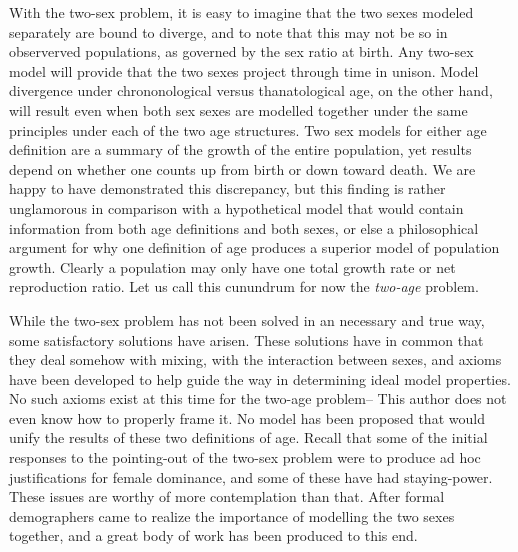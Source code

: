 With the two-sex problem, it is easy to imagine that the two sexes modeled
separately are bound to diverge, and to note that this may not be so in
observerved populations, as governed by the sex ratio at birth. Any two-sex
model will provide that the two sexes project through time in unison. Model
divergence under chrononological versus thanatological age, on the other hand,
will result even when both sex sexes are modelled together under the same principles under each
of the two age structures. Two sex models for either age definition are a
summary of the growth of the entire population, yet results depend on whether
one counts up from birth or down toward death. We are happy to have demonstrated
this discrepancy, but this finding is rather unglamorous in comparison with a
hypothetical model that would contain information from both age definitions and
both sexes, or else a philosophical argument for why one definition of age
produces a superior model of population growth. Clearly a population may only
have one total growth rate or net reproduction ratio. Let us call this cunundrum 
for now the \textit{two-age} problem.

While the two-sex problem has not been solved in an necessary and true way, some
satisfactory solutions have arisen. These solutions have in common that they
deal somehow with mixing, with the interaction between sexes, and axioms have
been developed to help guide the way in determining ideal model properties. No
such axioms exist at this time for the two-age problem-- This author does not
even know how to properly frame it. No model has been proposed
that would unify the results of these two definitions of age. Recall that some 
of the initial responses to the pointing-out of the two-sex problem
were to produce ad hoc justifications for female dominance, and some of these
have had staying-power. These issues are worthy of more contemplation than that.
After \citet{karmel1947relations} formal demographers came to realize the
importance of modelling the two sexes together, and a great body 
of work has been produced to this end. 

